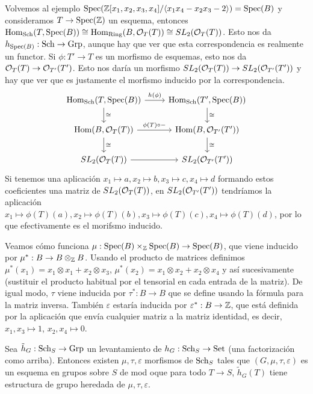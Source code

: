 \documentclass[GA.tex]{subfiles}
\begin{document}
\begin{ej}
Volvemos al ejemplo $\operatorname{Spec}(\mathbb{Z}[x_1,x_2,x_3,x_4]/\langle{x_1x_4-x_2x_3-2}\rangle)=\operatorname{Spec}(B)$ y consideramos $T\to\operatorname{Spec}(\mathbb{Z})$ un esquema, entonces $\operatorname{Hom}_{\operatorname{Sch}}(T, \operatorname{Spec}(B))\cong \operatorname{Hom}_{\operatorname{Ring}}(B,{\mathcal O}_T(T))\cong SL_2({\mathcal O}_T(T))$. Esto nos da $h_{\operatorname{Spec}(B)}:\operatorname{Sch}\to\operatorname{Grp}$, aunque hay que ver que esta correspondencia es realmente un functor. Si $\phi:T'\to T$ es un morfismo de esquemas, esto nos da ${\mathcal O}_T(T)\to{\mathcal O}_{T'}(T')$. Esto nos daría un morfismo $SL_2({\mathcal O}_T(T))\to SL_2({\mathcal O}_{T'}(T'))$ y hay que ver que es justamente el morfismo inducido por la correspondencia.
\[
\begin{tikzcd}
\Hom_{\Sch}(T,\spec(B))\arrow[r, "h(\phi)"]\arrow[d, "\cong"] & \Hom_{\Sch}(T',\spec(B))\arrow[d, "\cong"]\\
\Hom(B,\OO_T(T))\arrow[r, "\phi(T)\circ-"]\arrow[d, "\cong"] & \Hom(B,\OO_{T'}(T'))\arrow[d,"\cong"]\\
SL_2(\OO_T(T))\arrow[r] & SL_2(\OO_{T'}(T'))
\end{tikzcd}
\]
Si tenemos una aplicación $x_1\mapsto a, x_2\mapsto b, x_3\mapsto c, x_4\mapsto d$ formando estos coeficientes una matriz de $SL_2({\mathcal O}_T(T))$, en $SL_2({\mathcal O}_{T'}(T'))$ tendríamos la aplicación $x_1\mapsto \phi(T)(a), x_2\mapsto\phi(T)(b),x_3\mapsto\phi(T)(c),x_4\mapsto\phi(T)(d)$, por lo que efectivamente es el morifsmo inducido. 


Veamos cómo funciona $\mu:\operatorname{Spec}(B)\times_{\mathbb{Z}}\operatorname{Spec}(B)\to\operatorname{Spec}(B)$, que viene inducido por $\mu^*:B\to B\otimes_{\mathbb{Z}} B$. Usando el producto de matrices definimos $\mu^*(x_1)=x_1\otimes x_1+x_2\otimes x_3$, $\mu^*(x_2)=x_1\otimes x_2+x_2\otimes x_4$ y así sucesivamente (sustituir el producto habitual por el tensorial en cada entrada de la matriz). De igual modo, $\tau$ viene inducida por $\tau^*:B\to B$ que se define usando la fórmula para la matriz inversa. También $\varepsilon$ estaría inducida por $\varepsilon^*:B\to \mathbb{Z}$, que está definida por la aplicación que envía cualquier matriz a la matriz identidad, es decir, $x_1,x_3\mapsto 1$, $x_2,x_4\mapsto 0$. 
\end{ej}



\begin{prop}
Sea $\tilde{h}_G:\operatorname{Sch}_S\to\operatorname{Grp}$ un levantamiento de $h_G:\operatorname{Sch}_S\to\operatorname{Set}$ (una factorización como arriba). Entonces existen $\mu,\tau,\varepsilon$ morfismos de $\operatorname{Sch}_S$ tales que $(G,\mu,\tau,\varepsilon)$ es un esquema en grupos sobre $S$ de mod oque para todo $T\to S$, $\tilde{h}_G(T)$ tiene estructura de grupo heredada de $\mu,\tau,\varepsilon$. 
\end{prop}
\end{document}
